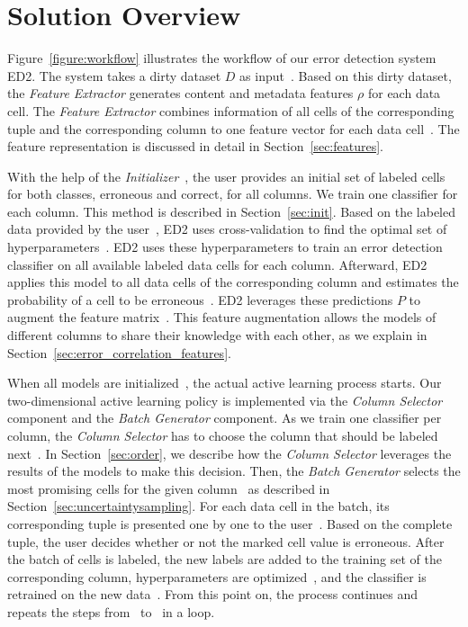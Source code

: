 \section{Solution Overview}
\label{sec:solution_overview}

Figure~\ref{figure:workflow} illustrates the workflow of our error detection system ED2. 
The system takes a dirty dataset $D$ as input~. 
Based on this dirty dataset, the \emph{Feature Extractor} generates content and metadata features $\rho$ for each data cell. 
The \emph{Feature Extractor} combines information of all cells of the corresponding tuple and the corresponding column to one feature vector for each data cell~.
The feature representation is discussed in detail in Section~\ref{sec:features}.

With the help of the \emph{Initializer}~, the user provides an initial set of labeled cells for both classes, erroneous and correct, for all columns. We train one classifier for each column. This method is described in Section~\ref{sec:init}.
Based on the labeled data provided by the user~, ED2 uses cross-validation to find the optimal set of hyperparameters~. 
ED2 uses these hyperparameters to train an error detection classifier on all available labeled data cells for each column. 
Afterward, ED2 applies this model to all data cells of the corresponding column and estimates the probability of a cell to be erroneous~. 
ED2 leverages these predictions $P$ to augment the feature matrix~. 
This feature augmentation allows the models of different columns to share their knowledge with each other, as we explain in Section~\ref{sec:error_correlation_features}. 

When all models are initialized~, the actual active learning process starts.
Our two-dimensional active learning policy is implemented via the \emph{Column Selector} component and the \emph{Batch Generator} component. 
As we train one classifier per column, the \emph{Column Selector} has to choose the column that should be labeled next~. In Section~\ref{sec:order}, we describe how the \emph{Column Selector} leverages the results of the models to make this decision.
Then, the \emph{Batch Generator} selects the most promising cells for the given column~ as described in Section~\ref{sec:uncertaintysampling}. 
For each data cell in the batch, its corresponding tuple is presented one by one to the user~. 
Based on the complete tuple, the user decides whether or not the marked cell value is erroneous. 
After the batch of cells is labeled, the new labels are added to the training set of the corresponding column, hyperparameters are optimized~, and the classifier is retrained on the new data~.
From this point on, the process continues and repeats the steps from~ to~ in a loop.

